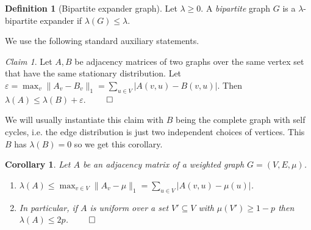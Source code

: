 \documentclass[10pt,a4paper]{article}
\newtheorem{corollary}[theorem]{Corollary}
\theoremstyle{definition}
\newtheorem{definition}[theorem]{Definition}
\theoremstyle{remark}
\newtheorem{claim}[theorem]{Claim}
\newcommand{\Authornotecolored}[3]{{\sffamily\small\color{#1}{[#2: #3]}}}
\newcommand{\Authornotecolored}[3]{}
\newcommand{\Ynote}{\Authornotecolored{Purple}{Y}}
\newcommand{\abs}[1]{\lvert#1\rvert}
\newcommand{\norm}[1]{\lVert#1\rVert}
\def\one{{\mathbf{1}}}
\renewcommand{\leq}{\leqslant}
\renewcommand{\geq}{\geqslant}
\numberwithin{equation}{section}
\begin{document}
\begin{definition}[Bipartite expander graph]
    Let \(\lambda \geq 0\). A \emph{bipartite} graph \(G\) is a \(\lambda\)-bipartite expander if \(\lambda(G) \leq \lambda\).
\end{definition}


We use the following standard auxiliary statements.
\begin{claim} \label{claim:close-distance}
    Let \(A,B\) be adjacency matrices of two graphs over the same vertex set that have the same stationary distribution. Let \(\varepsilon = \max_{v} \norm{A_v - B_v}_1 = \sum_{u \in V} \abs{A(v,u) - B(v,u)}\). Then \(\lambda(A) \leq \lambda(B) + \varepsilon\). \(\qed\)
\end{claim}


We will usually instantiate this claim with \(B\) being the complete graph with self cycles, i.e. the edge distribution is just two independent choices of vertices. This \(B\) has \(\lambda(B) = 0\) so we get this corollary.
\begin{corollary} \label{cor:closeness-to-uniform}
    Let \(A\) be an adjacency matrix of a weighted graph \(G=(V,E,\mu)\).
    \begin{enumerate}
        \item \(\lambda(A) \leq \max_{v \in V} \norm{A_v - \mu}_1 = \sum_{u \in V} \abs{A(v,u) - \mu(u)}\).
        \item In particular, if \(A\) is uniform over a set \(V' \subseteq V\) with \(\mu(V') \geq 1-p\) then \(\lambda(A) \leq 2p\). \(\qed\)
    \end{enumerate}
\end{corollary}
\end{document}
